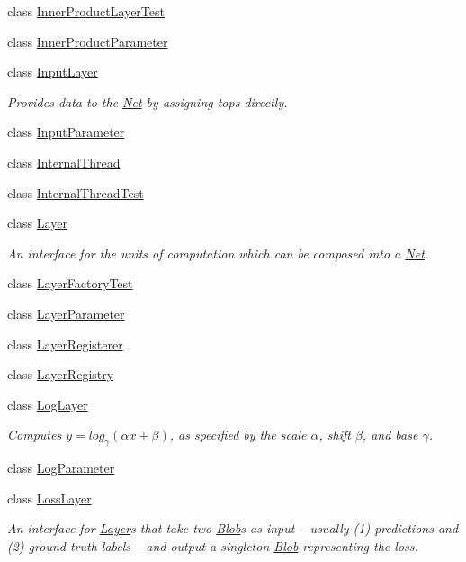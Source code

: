 \begin{DoxyCompactItemize}
class \mbox{\hyperlink{classcaffe_1_1_inner_product_layer_test}{Inner\+Product\+Layer\+Test}}
\item 
class \mbox{\hyperlink{classcaffe_1_1_inner_product_parameter}{Inner\+Product\+Parameter}}
\item 
class \mbox{\hyperlink{classcaffe_1_1_input_layer}{Input\+Layer}}
\begin{DoxyCompactList}\small\item\em Provides data to the \mbox{\hyperlink{classcaffe_1_1_net}{Net}} by assigning tops directly. \end{DoxyCompactList}\item 
class \mbox{\hyperlink{classcaffe_1_1_input_parameter}{Input\+Parameter}}
\item 
class \mbox{\hyperlink{classcaffe_1_1_internal_thread}{Internal\+Thread}}
\item 
class \mbox{\hyperlink{classcaffe_1_1_internal_thread_test}{Internal\+Thread\+Test}}
\item 
class \mbox{\hyperlink{classcaffe_1_1_layer}{Layer}}
\begin{DoxyCompactList}\small\item\em An interface for the units of computation which can be composed into a \mbox{\hyperlink{classcaffe_1_1_net}{Net}}. \end{DoxyCompactList}\item 
class \mbox{\hyperlink{classcaffe_1_1_layer_factory_test}{Layer\+Factory\+Test}}
\item 
class \mbox{\hyperlink{classcaffe_1_1_layer_parameter}{Layer\+Parameter}}
\item 
class \mbox{\hyperlink{classcaffe_1_1_layer_registerer}{Layer\+Registerer}}
\item 
class \mbox{\hyperlink{classcaffe_1_1_layer_registry}{Layer\+Registry}}
\item 
class \mbox{\hyperlink{classcaffe_1_1_log_layer}{Log\+Layer}}
\begin{DoxyCompactList}\small\item\em Computes $ y = log_{\gamma}(\alpha x + \beta) $, as specified by the scale $ \alpha $, shift $ \beta $, and base $ \gamma $. \end{DoxyCompactList}\item 
class \mbox{\hyperlink{classcaffe_1_1_log_parameter}{Log\+Parameter}}
\item 
class \mbox{\hyperlink{classcaffe_1_1_loss_layer}{Loss\+Layer}}
\begin{DoxyCompactList}\small\item\em An interface for \mbox{\hyperlink{classcaffe_1_1_layer}{Layer}}s that take two \mbox{\hyperlink{classcaffe_1_1_blob}{Blob}}s as input -- usually (1) predictions and (2) ground-\/truth labels -- and output a singleton \mbox{\hyperlink{classcaffe_1_1_blob}{Blob}} representing the loss. \end{DoxyCompactList}\item 

\end{DoxyCompactItemize}
